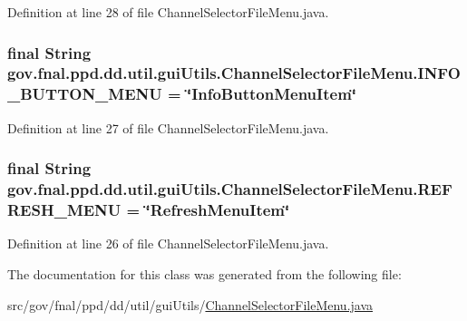 Definition at line 28 of file Channel\-Selector\-File\-Menu.\-java.

\hypertarget{classgov_1_1fnal_1_1ppd_1_1dd_1_1util_1_1guiUtils_1_1ChannelSelectorFileMenu_a9ea0cc4e03dc70d5fb50d4aff674a8ff}{
\subsubsection[{I\-N\-F\-O\-\_\-\-B\-U\-T\-T\-O\-N\-\_\-\-M\-E\-N\-U}]{\setlength{\rightskip}{0pt plus 5cm}final String gov.\-fnal.\-ppd.\-dd.\-util.\-gui\-Utils.\-Channel\-Selector\-File\-Menu.\-I\-N\-F\-O\-\_\-\-B\-U\-T\-T\-O\-N\-\_\-\-M\-E\-N\-U = \char`\"{}Info\-Button\-Menu\-Item\char`\"{}\hspace{0.3cm}{\ttfamily [static]}}}\label{classgov_1_1fnal_1_1ppd_1_1dd_1_1util_1_1guiUtils_1_1ChannelSelectorFileMenu_a9ea0cc4e03dc70d5fb50d4aff674a8ff}


Definition at line 27 of file Channel\-Selector\-File\-Menu.\-java.

\hypertarget{classgov_1_1fnal_1_1ppd_1_1dd_1_1util_1_1guiUtils_1_1ChannelSelectorFileMenu_aa4c2a6d74c7069f6fea17cc166dd1c67}{
\subsubsection[{R\-E\-F\-R\-E\-S\-H\-\_\-\-M\-E\-N\-U}]{\setlength{\rightskip}{0pt plus 5cm}final String gov.\-fnal.\-ppd.\-dd.\-util.\-gui\-Utils.\-Channel\-Selector\-File\-Menu.\-R\-E\-F\-R\-E\-S\-H\-\_\-\-M\-E\-N\-U = \char`\"{}Refresh\-Menu\-Item\char`\"{}\hspace{0.3cm}{\ttfamily [static]}}}\label{classgov_1_1fnal_1_1ppd_1_1dd_1_1util_1_1guiUtils_1_1ChannelSelectorFileMenu_aa4c2a6d74c7069f6fea17cc166dd1c67}


Definition at line 26 of file Channel\-Selector\-File\-Menu.\-java.



The documentation for this class was generated from the following file\-:\begin{DoxyCompactItemize}
\item 
src/gov/fnal/ppd/dd/util/gui\-Utils/\hyperlink{ChannelSelectorFileMenu_8java}{Channel\-Selector\-File\-Menu.\-java}\end{DoxyCompactItemize}
